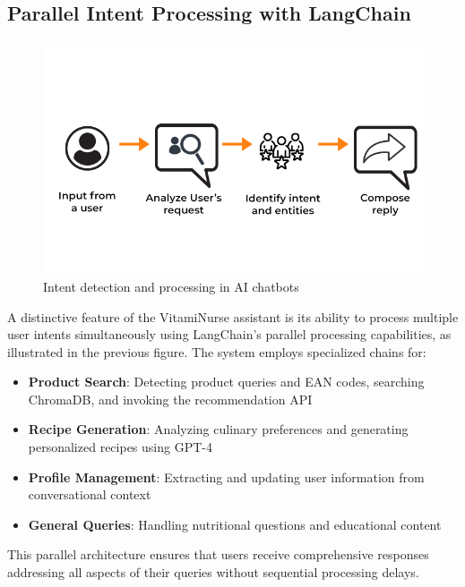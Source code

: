 \subsection{Parallel Intent Processing with LangChain}
\begin{center}
\begin{figure}[H]
\includegraphics[scale=0.65]{images/how_AI_chatbot_works.png}
\caption{Intent detection and processing in AI chatbots} 
\label{fig:intent_detection}
\end{figure}
\end{center}

A distinctive feature of the VitamiNurse assistant is its ability to process multiple user intents simultaneously using LangChain's parallel processing capabilities, as illustrated in the previous figure. The system employs specialized chains for:
\begin{itemize}
\item \textbf{Product Search}: Detecting product queries and EAN codes, searching ChromaDB, and invoking the recommendation API
\item \textbf{Recipe Generation}: Analyzing culinary preferences and generating personalized recipes using GPT-4
\item \textbf{Profile Management}: Extracting and updating user information from conversational context
\item \textbf{General Queries}: Handling nutritional questions and educational content
\end{itemize}

This parallel architecture ensures that users receive comprehensive responses addressing all aspects of their queries without sequential processing delays.

